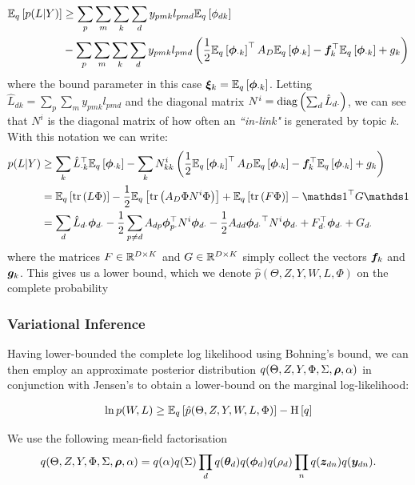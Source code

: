 \begin{align}
\ex{p(L|Y)}{q} & \geq \sum_p \sum_m \sum_k \sum_d y_{pmk} l_{pmd} \ex{\phi_{dk}}{q} \\
 & - \sum_p \sum_m \sum_k \sum_d y_{pmk} l_{pmd} \left(\half \ex{\phok}{q}\T A_D \ex{\phok}{q} - \vv{f}_k\T \ex{\phok}{q} + g_k\right)
\end{align}
where the bound parameter in this case $\vv{\xi}_k = \ex{\phok}{q}$. Letting $\hat{L}_{dk} = \sum_p \sum_m y_{pmk} l_{pmd}$ and the diagonal matrix $N^i = \diag{\sum_d \hat{L}_{d\cdot}}$, we can see that $N^i$ is the diagonal matrix of how often an \emph{``in-link"} is generated by topic $k$. With this notation we can write:
\begin{align}
p(L|Y) & \geq \sum_k \hat{L}_{\cdot k}\T \ex{\phok}{q} - \sum_k N^i_{kk} \left(\half \ex{\phok}{q}\T A_D \ex{\phok}{q} - \vv{f}_k\T \ex{\phok}{q} + g_k\right) \\
& = \ex{\Tr{L \Phi}}{q} - \half \ex{\Tr{A_D \Phi N^i \Phi}}{q} + \ex{\Tr{F \Phi}}{q} - \one\T G \one \\
& = \sum_d \hat{L}_{d\cdot} \phdo - \half \sum_{p \neq d} A_{dp} \vv{\phi}_{p\cdot}\T N^i \phdo -\half A_{dd} \phdo\T N^i \phdo + F_{d\cdot}\T\phdo + G_{d\cdot}
\end{align}
where the matrices $F \in \MReal{D}{K}$ and $G \in \MReal{D}{K}$ simply collect the vectors $\vv{f}_k$ and $\vv{g}_k$. This gives us a lower bound, which we denote $\hat{p}(\Theta, Z, Y, W, L, \Phi)$  on the complete probability


\subsubsection*{Variational Inference}
Having lower-bounded the complete log likelihood using Bohning's bound, we can then employ an approximate posterior distribution $q(\Theta, Z, Y, \Phi, \Sigma, \vv{\rho}, \alpha)$ in conjunction with Jensen's to obtain a lower-bound on the marginal log-likelihood:

\begin{align}
\ln p(W, L) \geq \ex{\hat{p}(\Theta, Z, Y, W, L, \Phi)}{q} - \ent{q}
\end{align}

We use the following mean-field factorisation
\begin{align}
q(\Theta, Z, Y, \Phi, \Sigma, \vv{\rho}, \alpha) = q(\alpha)q(\Sigma)\prod_d q(\thd)q(\vv{\phi}_d)q(\rho_d)\prod_n q(\vv{z}_{dn})q(\vv{y}_{dn}).
\end{align}

